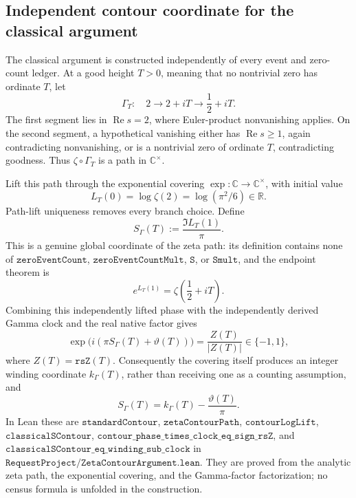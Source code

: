 \documentclass[11pt]{article}
\theoremstyle{definition}
\renewcommand{\Re}{\operatorname{Re}}
\begin{document}
\subsection{Independent contour coordinate for the classical argument}
The classical argument is constructed independently of every event and
zero-count ledger.  At a good height \(T>0\), meaning that no nontrivial zero
has ordinate \(T\), let
\[
 \Gamma_T:\quad 2\longrightarrow 2+iT\longrightarrow \frac12+iT.
\]
The first segment lies in \(\Re s=2\), where Euler-product nonvanishing
applies.  On the second segment, a hypothetical vanishing either has
\(\Re s\geq1\), again contradicting nonvanishing, or is a nontrivial zero of
ordinate \(T\), contradicting goodness.  Thus
\(\zeta\circ\Gamma_T\) is a path in \(\mathbb C^\times\).

Lift this path through the exponential covering
\(\exp:\mathbb C\to\mathbb C^\times\), with initial value
\[
 L_T(0)=\log\zeta(2)=\log(\pi^2/6)\in\mathbb R.
\]
Path-lift uniqueness removes every branch choice.  Define
\begin{equation}\label{eq:st-contour-definition}
 S_\Gamma(T):=\frac{\Im L_T(1)}{\pi}.
\end{equation}
This is a genuine global coordinate of the zeta path: its definition contains
none of \(\texttt{zeroEventCount}\), \(\texttt{zeroEventCountMult}\),
\(\texttt{S}\), or \(\texttt{Smult}\), and the endpoint theorem is
\[
 e^{L_T(1)}=\zeta\!\left(\frac12+iT\right).
\]
Combining this independently lifted phase with the independently derived
Gamma clock and the real native factor gives
\begin{equation}\label{eq:st-contour-sign}
 \exp\!\bigl(i(\pi S_\Gamma(T)+\vartheta(T))\bigr)
 =\frac{Z(T)}{|Z(T)|}\in\{-1,1\},
\end{equation}
where \(Z(T)=\texttt{rsZ}(T)\).  Consequently the covering itself produces an
integer winding coordinate \(k_\Gamma(T)\), rather than receiving one as a
counting assumption, and
\begin{equation}\label{eq:st-contour-winding}
 \boxed{\quad S_\Gamma(T)=k_\Gamma(T)-\frac{\vartheta(T)}{\pi}.\quad}
\end{equation}
In Lean these are
\(\texttt{standardContour}\), \(\texttt{zetaContourPath}\),
\(\texttt{contourLogLift}\), \(\texttt{classicalSContour}\),
\(\texttt{contour\_phase\_times\_clock\_eq\_sign\_rsZ}\), and
\(\texttt{classicalSContour\_eq\_winding\_sub\_clock}\) in
\(\texttt{RequestProject/ZetaContourArgument.lean}\).  They are proved from
the analytic zeta path, the exponential covering, and the Gamma-factor
factorization; no census formula is unfolded in the construction.
\end{document}
